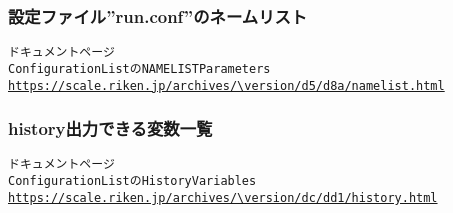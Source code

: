 \subsubsection{設定ファイル''run.conf''のネームリスト} \label{subsubsec:namelist_run}

\begin{alltt}
 \scalerm ドキュメントページ
 Configuration List の NAMELIST Parameters 
 \url{https://scale.riken.jp/archives/\version/d5/d8a/namelist.html}
\end{alltt}


\subsubsection{history出力できる変数一覧} \label{subsubsec:histroy_item}

\begin{alltt}
 \scalerm ドキュメントページ
 Configuration List の History Variables
 \url{https://scale.riken.jp/archives/\version/dc/dd1/history.html}
\end{alltt}





